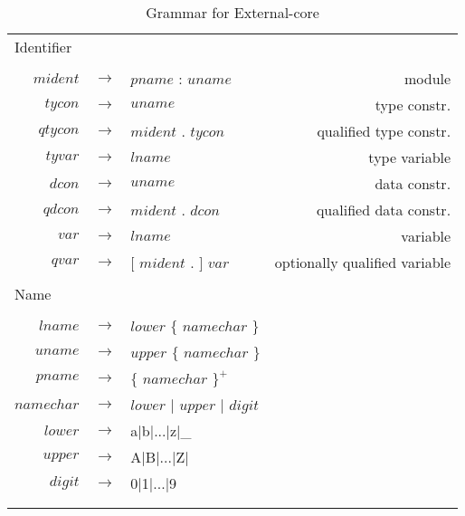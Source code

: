 \begin{scriptsize}
\begin{longtable}{ r c l r }
\multicolumn{4}{l}{Identifier}			 \\
\\[0.01in]
$mident$	& $ \rightarrow $	& $pname$ : $uname$									& module		\\
$tycon$		& $ \rightarrow $	& $uname$										& type constr.		\\
$qtycon$	& $ \rightarrow $	& $mident$ . $tycon$									& qualified type constr.\\
$tyvar$		& $ \rightarrow $	& $lname$										& type variable		\\
$dcon$		& $ \rightarrow $	& $uname$										& data constr.		\\
$qdcon$		& $ \rightarrow $	& $mident$ . $dcon$									& qualified data constr.\\
$var$		& $ \rightarrow $	& $lname$										& variable		\\
$qvar$		& $ \rightarrow $	& $[$ $mident$ . $]$ $var$								& optionally qualified variable\\
\\[0.01in]

\multicolumn{4}{l}{Name}			 \\
\\[0.01in]
$lname$		& $ \rightarrow $	& $lower$ $\{$ $namechar$ $\}$								& \\
$uname$		& $ \rightarrow $	& $upper$ $\{$ $namechar$ $\}$								& \\
$pname$		& $ \rightarrow $	& $\{$ $namechar$ $\}^{+}$								& \\
$namechar$	& $ \rightarrow $	& $lower$ $|$ $upper$ $|$ $digit$							& \\
$lower$		& $ \rightarrow $	& a$|$b$|$...$|$z$|$\_									& \\
$upper$		& $ \rightarrow $	& A$|$B$|$...$|$Z$|$									& \\
$digit$		& $ \rightarrow $	& 0$|$1$|$...$|$9									& \\
\\[0.01in]

\caption{Grammar for External-core}
\label{core}

\end{longtable}
\end{scriptsize}


